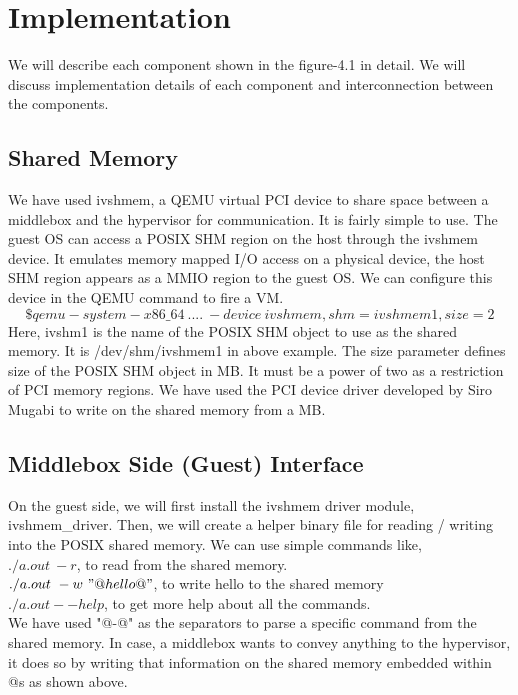 \documentclass[a4paper,11pt]{report}
\begin{document}
\section{Implementation}
We will describe each component shown in the figure-4.1 in detail. We will discuss implementation details of each component and interconnection between the components.
\subsection{Shared Memory}
We have used ivshmem\cite{IV}, a QEMU virtual PCI device to share space between a middlebox and the hypervisor for communication. It is fairly simple to use\cite{IV}. The guest OS can access a POSIX SHM region on the host through the ivshmem device. It emulates memory mapped I/O access on a physical device, the host SHM region appears as a MMIO region to the guest OS. We can configure this device in the QEMU command to fire a VM.
$$\$ qemu-system-x86\_64\ ....\ -device\ ivshmem,shm=ivshmem1,size=2$$    
Here, ivshm1 is the name of the POSIX SHM object to use as the shared memory. It is /dev/shm/ivshmem1 in above example. The size parameter defines size of the POSIX SHM object in MB. It must be a power of two as a restriction of PCI memory regions. We have used the PCI device driver developed by Siro Mugabi\cite{IV} to write on the shared memory from a MB.
\subsection{Middlebox Side (Guest) Interface}
On the guest side, we will first install the ivshmem driver module, ivshmem\_driver. Then, we will create a helper binary file for reading / writing into the POSIX shared memory. We can use simple commands like, \\
$./a.out\ -r$, to read from the shared memory. \\
$./a.out\ -w\ "@hello@"$, to write hello to the shared memory \\
$./a.out --help$, to get more help about all the commands. \\
We have used "@-@" as the separators to parse a specific command from the shared memory. In case, a middlebox wants to convey anything to the hypervisor, it does so by writing that information on the shared memory embedded within @s as shown above.   
\end{document}
